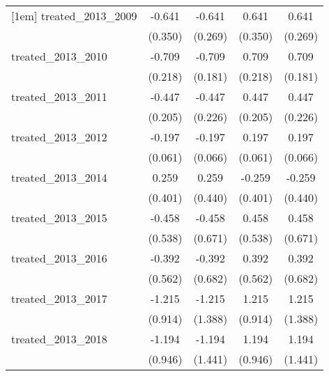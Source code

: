 {\begin{tabular}{l*{4}{c}}
[1em]
treated\_2013\_2009&      -0.641         &      -0.641\sym{*}  &       0.641         &       0.641\sym{*}  \\
            &     (0.350)         &     (0.269)         &     (0.350)         &     (0.269)         \\
[1em]
treated\_2013\_2010&      -0.709\sym{**} &      -0.709\sym{***}&       0.709\sym{**} &       0.709\sym{***}\\
            &     (0.218)         &     (0.181)         &     (0.218)         &     (0.181)         \\
[1em]
treated\_2013\_2011&      -0.447\sym{*}  &      -0.447\sym{*}  &       0.447\sym{*}  &       0.447\sym{*}  \\
            &     (0.205)         &     (0.226)         &     (0.205)         &     (0.226)         \\
[1em]
treated\_2013\_2012&      -0.197\sym{**} &      -0.197\sym{**} &       0.197\sym{**} &       0.197\sym{**} \\
            &     (0.061)         &     (0.066)         &     (0.061)         &     (0.066)         \\
[1em]
treated\_2013\_2014&       0.259         &       0.259         &      -0.259         &      -0.259         \\
            &     (0.401)         &     (0.440)         &     (0.401)         &     (0.440)         \\
[1em]
treated\_2013\_2015&      -0.458         &      -0.458         &       0.458         &       0.458         \\
            &     (0.538)         &     (0.671)         &     (0.538)         &     (0.671)         \\
[1em]
treated\_2013\_2016&      -0.392         &      -0.392         &       0.392         &       0.392         \\
            &     (0.562)         &     (0.682)         &     (0.562)         &     (0.682)         \\
[1em]
treated\_2013\_2017&      -1.215         &      -1.215         &       1.215         &       1.215         \\
            &     (0.914)         &     (1.388)         &     (0.914)         &     (1.388)         \\
[1em]
treated\_2013\_2018&      -1.194         &      -1.194         &       1.194         &       1.194         \\
            &     (0.946)         &     (1.441)         &     (0.946)         &     (1.441)         \\

\end{tabular}}
